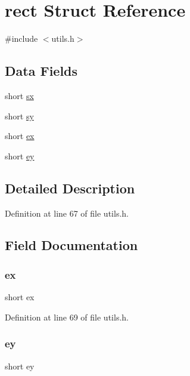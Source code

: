 \hypertarget{structrect}{}\section{rect Struct Reference}
\label{structrect}


{\ttfamily \#include $<$utils.\+h$>$}

\subsection*{Data Fields}
\begin{DoxyCompactItemize}
\item 
short \mbox{\hyperlink{structrect_ad412d3c503fde76edb4b79e9bb5bdee4}{sx}}
\item 
short \mbox{\hyperlink{structrect_a0153fced86e1addd87ec429590e82741}{sy}}
\item 
short \mbox{\hyperlink{structrect_a038ce30271f5797f8c1c7b2e1c8e26df}{ex}}
\item 
short \mbox{\hyperlink{structrect_adeefbf5e85f617bde8321e301d081680}{ey}}
\end{DoxyCompactItemize}


\subsection{Detailed Description}


Definition at line 67 of file utils.\+h.



\subsection{Field Documentation}
\mbox{\label{structrect_a038ce30271f5797f8c1c7b2e1c8e26df}} 
\subsubsection{\texorpdfstring{ex}{ex}}
{\footnotesize\ttfamily short ex}



Definition at line 69 of file utils.\+h.

\mbox{\label{structrect_adeefbf5e85f617bde8321e301d081680}} 
\subsubsection{\texorpdfstring{ey}{ey}}
{\footnotesize\ttfamily short ey}




